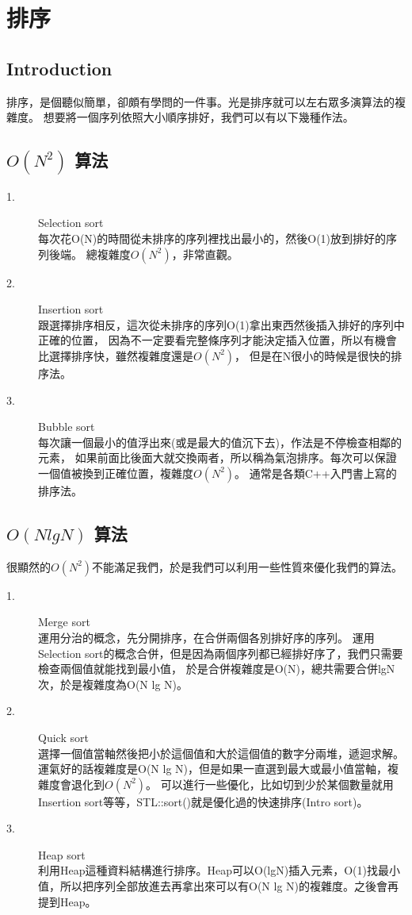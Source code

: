 \documentclass{article}
\begin{document}
\section{排序}

\subsection*{Introduction}
排序，是個聽似簡單，卻頗有學問的一件事。光是排序就可以左右眾多演算法的複雜度。
想要將一個序列依照大小順序排好，我們可以有以下幾種作法。

\subsection{ $O(N^2)$ 算法}
\begin{description}
\item[ 1.]Selection sort\\
每次花O(N)的時間從未排序的序列裡找出最小的，然後O(1)放到排好的序列後端。
總複雜度$O(N^2)$，非常直觀。
\item[ 2.]Insertion sort\\
跟選擇排序相反，這次從未排序的序列O(1)拿出東西然後插入排好的序列中正確的位置，
因為不一定要看完整條序列才能決定插入位置，所以有機會比選擇排序快，雖然複雜度還是$O(N^2)$，
但是在N很小的時候是很快的排序法。
\item[ 3.]Bubble sort\\
每次讓一個最小的值浮出來(或是最大的值沉下去)，作法是不停檢查相鄰的元素，
如果前面比後面大就交換兩者，所以稱為氣泡排序。每次可以保證一個值被換到正確位置，複雜度$O(N^2)$。
通常是各類C++入門書上寫的排序法。
\end{description} 

\subsection{ $O(N lg N)$ 算法}
很顯然的$O(N^2)$不能滿足我們，於是我們可以利用一些性質來優化我們的算法。
\begin{description}
\item[ 1.]Merge sort\\
運用分治的概念，先分開排序，在合併兩個各別排好序的序列。
運用Selection sort的概念合併，但是因為兩個序列都已經排好序了，我們只需要檢查兩個值就能找到最小值，
於是合併複雜度是O(N)，總共需要合併lgN次，於是複雜度為O(N lg N)。
\item[ 2.]Quick sort\\
選擇一個值當軸然後把小於這個值和大於這個值的數字分兩堆，遞迴求解。
運氣好的話複雜度是O(N lg N)，但是如果一直選到最大或最小值當軸，複雜度會退化到$O(N^2)$。
可以進行一些優化，比如切到少於某個數量就用Insertion sort等等，STL::sort()就是優化過的快速排序(Intro sort)。
\item[ 3.]Heap sort\\
利用Heap這種資料結構進行排序。Heap可以O(lgN)插入元素，O(1)找最小值，所以把序列全部放進去再拿出來可以有O(N lg N)的複雜度。之後會再提到Heap。
\end{description} 
\end{document}
